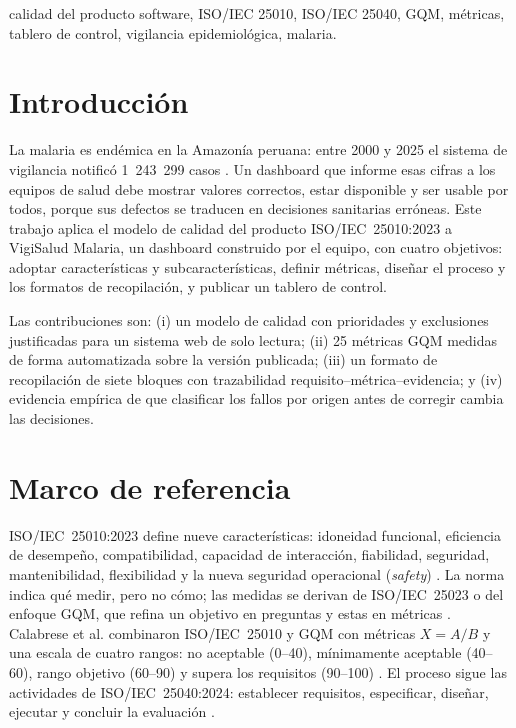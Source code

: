 \documentclass[conference,a4paper]{IEEEtran}
\begin{document}
\begin{IEEEkeywords}
calidad del producto software, ISO/IEC 25010, ISO/IEC 25040, GQM, métricas, tablero de control, vigilancia epidemiológica, malaria.
\end{IEEEkeywords}

\section{Introducción}
La malaria es endémica en la Amazonía peruana: entre 2000 y 2025 el sistema de vigilancia notificó 1~243~299 casos \cite{minsa}. Un dashboard que informe esas cifras a los equipos de salud debe mostrar valores correctos, estar disponible y ser usable por todos, porque sus defectos se traducen en decisiones sanitarias erróneas. Este trabajo aplica el modelo de calidad del producto ISO/IEC~25010:2023 \cite{iso25010} a VigiSalud Malaria, un dashboard construido por el equipo, con cuatro objetivos: adoptar características y subcaracterísticas, definir métricas, diseñar el proceso y los formatos de recopilación, y publicar un tablero de control.

Las contribuciones son: (i) un modelo de calidad con prioridades y exclusiones justificadas para un sistema web de solo lectura; (ii) 25 métricas GQM medidas de forma automatizada sobre la versión publicada; (iii) un formato de recopilación de siete bloques con trazabilidad requisito--métrica--evidencia; y (iv) evidencia empírica de que clasificar los fallos por origen antes de corregir cambia las decisiones.

\section{Marco de referencia}
ISO/IEC~25010:2023 define nueve características: idoneidad funcional, eficiencia de desempeño, compatibilidad, capacidad de interacción, fiabilidad, seguridad, mantenibilidad, flexibilidad y la nueva seguridad operacional (\emph{safety}) \cite{iso25010}. La norma indica qué medir, pero no cómo; las medidas se derivan de ISO/IEC~25023 \cite{iso25023} o del enfoque GQM, que refina un objetivo en preguntas y estas en métricas \cite{basili}. Calabrese et al. combinaron ISO/IEC~25010 y GQM con métricas $X=A/B$ y una escala de cuatro rangos: no aceptable (0--40), mínimamente aceptable (40--60), rango objetivo (60--90) y supera los requisitos (90--100) \cite{calabrese}. El proceso sigue las actividades de ISO/IEC~25040:2024: establecer requisitos, especificar, diseñar, ejecutar y concluir la evaluación \cite{iso25040}.
\end{document}
